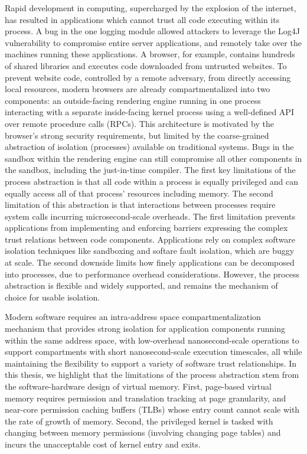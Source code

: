 Rapid development in computing, supercharged by the explosion of the internet,
has resulted in applications which cannot trust all code executing within
its process.
A bug in the one logging module allowed attackers to leverage the Log4J
vulnerability to compromise entire server applications, 
and remotely take over the machines running these applications.
A browser, for example, contains hundreds of shared libraries and executes
code downloaded from untrusted websites.
To prevent website code, controlled by a remote adversary, from directly 
accessing local resources, modern browsers are already compartmentalized into
two components: 
an outside-facing rendering engine running in one process 
interacting with 
a separate inside-facing kernel process
using a well-defined API over remote procedure calls (RPCs).
This architecture is motivated by the browser's strong security requirements,
but limited by the coarse-grained abstraction of isolation (processes)
available on traditional systems.
Bugs in the sandbox within the rendering engine can still compromise all
other components in the sandbox, including the just-in-time compiler.
The first key limitations of the process abstraction is that
all code within a process is equally privileged and 
can equally access all of that process' resources including memory.
The second limitation of this abstraction is that interactions between 
processes require system calls incurring microsecond-scale overheads.
The first limitation prevents applications from implementing and enforcing 
barriers expressing the complex trust relations between code components.
Applications rely on complex software isolation techniques like 
sandboxing and softare fault isolation,
which are buggy at scale.
The second downside limits how finely applications can be decomposed into
processes, due to performance overhead considerations.
However, the process abstraction is flexible and widely supported, 
and remains the mechanism of choice for usable isolation.

Modern software requires an intra-address space compartmentalization mechanism
that provides strong isolation for application components
running within the same address space, with
low-overhead nanosecond-scale operations to support compartments with short
nanosecond-scale execution timescales, all while maintaining the flexibility
to support a variety of software trust relationships.
In this thesis, we highlight that the limitations of the process abstraction
stem from the software-hardware design of virtual memory.
First, page-based virtual memory requires permission and translation tracking
at page granularity, and near-core permission caching buffers (TLBs) whose
entry count cannot scale with the rate of growth of memory.
Second, the privileged kernel is tasked with changing between memory 
permissions (involving changing page tables) and incurs the unacceptable
cost of kernel entry and exits.

